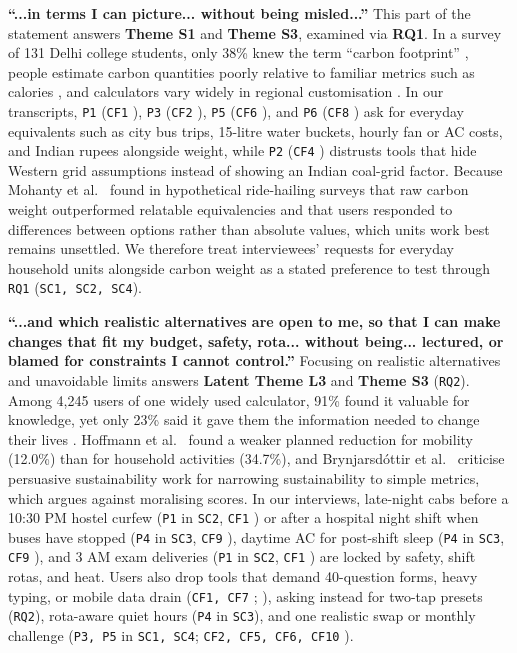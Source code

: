 \documentclass[12pt, a4paper]{article}
\begin{document}
\textbf{``...in terms I can picture... without being misled...''}
This part of the statement answers \textbf{Theme S1} and \textbf{Theme S3}, examined via \textbf{RQ1}. In a survey of 131 Delhi college students, only 38\% knew the term ``carbon footprint'' \cite{gandhi2025}, people estimate carbon quantities poorly relative to familiar metrics such as calories \cite{grinstein2018}, and calculators vary widely in regional customisation \cite{mulrow2019}. In our transcripts, \texttt{P1} (\texttt{CF1} \cite{cf1}), \texttt{P3} (\texttt{CF2} \cite{cf2}), \texttt{P5} (\texttt{CF6} \cite{cf6}), and \texttt{P6} (\texttt{CF8} \cite{cf8}) ask for everyday equivalents such as city bus trips, 15-litre water buckets, hourly fan or AC costs, and Indian rupees alongside weight, while \texttt{P2} (\texttt{CF4} \cite{cf4}) distrusts tools that hide Western grid assumptions instead of showing an Indian coal-grid factor. Because Mohanty et al.\ \cite{mohanty2023} found in hypothetical ride-hailing surveys that raw carbon weight outperformed relatable equivalencies and that users responded to differences between options rather than absolute values, which units work best remains unsettled. We therefore treat interviewees' requests for everyday household units alongside carbon weight as a stated preference to test through \texttt{RQ1} (\texttt{SC1, SC2, SC4}).

\textbf{``...and which realistic alternatives are open to me, so that I can make changes that fit my budget, safety, rota... without being... lectured, or blamed for constraints I cannot control.''}
Focusing on realistic alternatives and unavoidable limits answers \textbf{Latent Theme L3} and \textbf{Theme S3} (\texttt{RQ2}). Among 4,245 users of one widely used calculator, 91\% found it valuable for knowledge, yet only 23\% said it gave them the information needed to change their lives \cite{collins2020}. Hoffmann et al.\ \cite{hoffmann2024} found a weaker planned reduction for mobility (12.0\%) than for household activities (34.7\%), and Brynjarsd\'{o}ttir et al.\ \cite{brynjarsdottir2012} criticise persuasive sustainability work for narrowing sustainability to simple metrics, which argues against moralising scores. In our interviews, late-night cabs before a 10:30 PM hostel curfew (\texttt{P1} in \texttt{SC2}, \texttt{CF1} \cite{cf1}) or after a hospital night shift when buses have stopped (\texttt{P4} in \texttt{SC3}, \texttt{CF9} \cite{cf9}), daytime AC for post-shift sleep (\texttt{P4} in \texttt{SC3}, \texttt{CF9} \cite{cf9}), and 3 AM exam deliveries (\texttt{P1} in \texttt{SC2}, \texttt{CF1} \cite{cf1}) are locked by safety, shift rotas, and heat. Users also drop tools that demand 40-question forms, heavy typing, or mobile data drain (\texttt{CF1, CF7} \cite{cf1,cf7}; \cite{hoffmann2024}), asking instead for two-tap presets (\texttt{RQ2}), rota-aware quiet hours (\texttt{P4} in \texttt{SC3}), and one realistic swap or monthly challenge (\texttt{P3, P5} in \texttt{SC1, SC4}; \texttt{CF2, CF5, CF6, CF10} \cite{cf2,cf5,cf6,cf10}).
\end{document}
